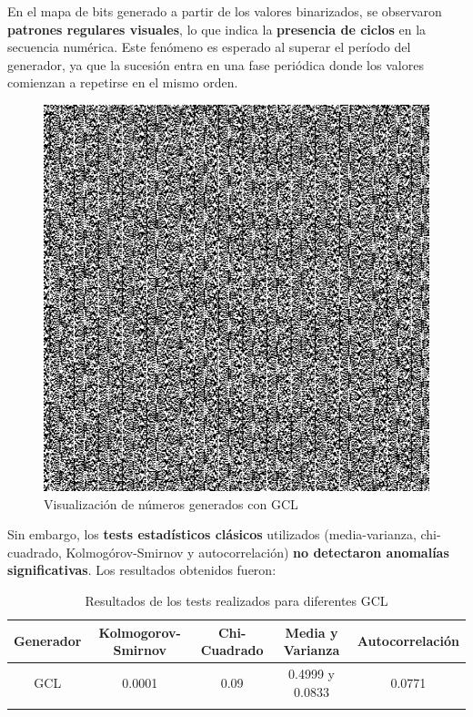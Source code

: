 \documentclass{article}
\begin{document}
    {En el mapa de bits} generado a partir de los valores binarizados, se observaron \textbf{patrones regulares visuales}, lo que indica la \textbf{presencia de ciclos} en la secuencia numérica. Este fenómeno es esperado al superar el período del generador, ya que la sucesión entra en una fase periódica donde los valores comienzan a repetirse en el mismo orden.
    \begin{figure}[H]
        \centering
        \begin{minipage}[t]{0.31\textwidth}
            \centering
            \includegraphics[width=\textwidth]{visualizaciones_error/GCL_bitmap.png}
            \caption{Visualización de números generados con GCL}
            \label{fig:gcl_vis_err}
        \end{minipage}
    \end{figure}
    Sin embargo, los \textbf{tests estadísticos clásicos} utilizados (media-varianza, chi-cuadrado, Kolmogórov-Smirnov y autocorrelación) \textbf{no detectaron anomalías significativas}. Los resultados obtenidos fueron:


\begin{table}[ht]
    \centering
    \begin{tabular}{@{}ccccc@{}}
        \toprule
        Generador         & Kolmogorov-Smirnov & Chi-Cuadrado & Media y Varianza      & Autocorrelación \\ \midrule
        GCL               & 0.0001             & 0.09          & 0.4999 y 0.0833      & 0.0771          \\
                \\ \bottomrule
    \end{tabular}
    \caption{Resultados de los tests realizados para diferentes GCL}
    \end{table}
    
\end{document}
